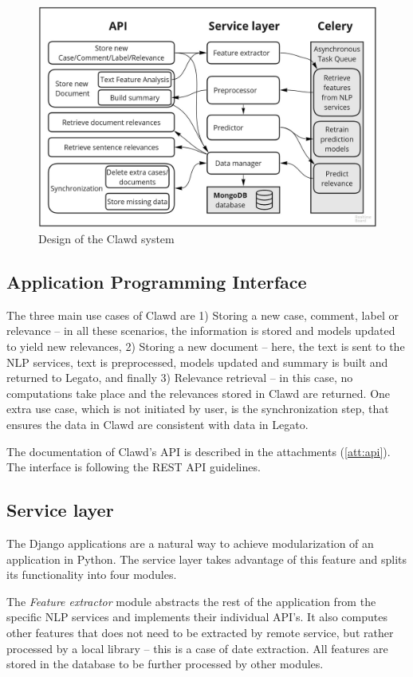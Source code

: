 \documentclass[
  digital, %
  notable,   %
  nolof,     %
  nolot,     %
]{fithesis3}
\begin{document}
\begin{figure}[h]
\caption{Design of the Clawd system}
\label{fig:Design}
\includegraphics[width=\textwidth]{img/Design}
\end{figure}

\subsection{Application Programming Interface}
\label{sec:api}
The three main use cases of Clawd are 1) Storing a new case, comment, label or relevance -- in all these scenarios, the information is stored and models updated to yield new relevances, 2) Storing a new document -- here, the text is sent to the NLP services, text is preprocessed, models updated and summary is built and returned to Legato, and finally 3) Relevance retrieval -- in this case, no computations take place and the relevances stored in Clawd are returned.
One extra use case, which is not initiated by user, is the synchronization step, that ensures the data in Clawd are consistent with data in Legato.

The documentation of Clawd's API is described in the attachments (\ref{att:api}).
The interface is following the REST API guidelines.

\subsection{Service layer}
The Django applications are a natural way to achieve modularization of an application in Python.
The service layer takes advantage of this feature and splits its functionality into four modules.

The \textit{Feature extractor} module abstracts the rest of the application from the specific NLP services and implements their individual API's.
It also computes other features that does not need to be extracted by remote service, but rather processed by a local library -- this is a case of date extraction.
All features are stored in the database to be further processed by other modules.
\end{document}

